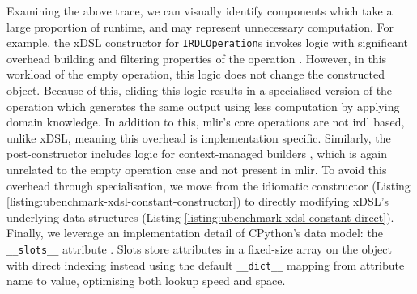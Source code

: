 Examining the above trace, we can visually identify components which take a large proportion of runtime, and may represent unnecessary computation.
For example, the xDSL constructor for \texttt{IRDLOperation}s invokes logic with significant overhead building and filtering properties of the operation . However, in this workload of the empty operation, this logic does not change the constructed object. Because of this, eliding this logic results in a specialised version of the operation which generates the same output using less computation by applying domain knowledge.
In addition to this, \ac{mlir}'s core operations are not \ac{irdl} based, unlike xDSL, meaning this overhead is implementation specific.
Similarly, the post-constructor includes logic for context-managed builders , which is again unrelated to the empty operation case and not present in \ac{mlir}.
To avoid this overhead through specialisation, we move from the idiomatic constructor (Listing \ref{listing:ubenchmark-xdsl-constant-constructor}) to directly modifying xDSL's underlying data structures (Listing \ref{listing:ubenchmark-xdsl-constant-direct}).
Finally, we leverage an implementation detail of CPython's data model: the \texttt{__slots__} attribute \cite{}. Slots store attributes in a fixed-size array on the object with direct indexing instead using the default \texttt{__dict__} mapping from attribute name to value, optimising both lookup speed and space.

